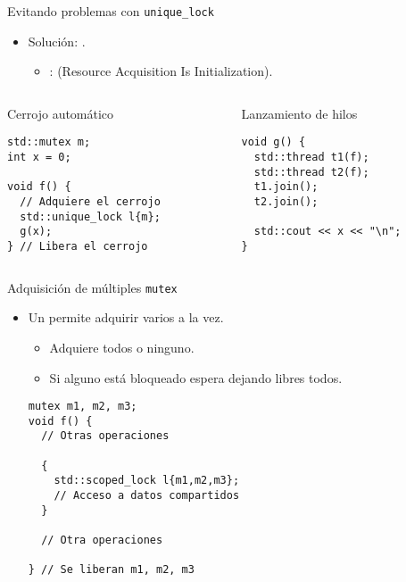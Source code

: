 \begin{frame}[t,fragile]{Evitando problemas con \texttt{unique\_lock}}
\begin{itemize}
  \item Solución: .
    \begin{itemize}
      \item {}:  (Resource Acquisition Is Initialization).
    \end{itemize}
\end{itemize}

\begin{columns}[T]
\begin{column}{.5\textwidth}
\begin{block}{Cerrojo automático}
\begin{lstlisting}
std::mutex m;
int x = 0;

void f() {
  // Adquiere el cerrojo
  std::unique_lock l{m}; 
  g(x);
} // Libera el cerrojo
\end{lstlisting}
\end{block}
\end{column}

\begin{column}{.5\textwidth}
\begin{block}{Lanzamiento de hilos}
\begin{lstlisting}
void g() {
  std::thread t1(f); 
  std::thread t2(f);
  t1.join(); 
  t2.join();

  std::cout << x << "\n";
}
\end{lstlisting}
\end{block}
\end{column}
\end{columns}
\end{frame}


\begin{frame}[fragile]{Adquisición de múltiples \texttt{mutex}}
\begin{itemize}
  \item Un  permite adquirir varios  a la vez.
    \begin{itemize}
      \item Adquiere todos o ninguno.
      \item Si alguno está bloqueado espera dejando libres todos.
    \end{itemize}
\begin{lstlisting}
mutex m1, m2, m3;
void f() {
  // Otras operaciones

  {
    std::scoped_lock l{m1,m2,m3};
    // Acceso a datos compartidos
  }

  // Otra operaciones

} // Se liberan m1, m2, m3
\end{lstlisting}
\end{itemize}
\end{frame}
